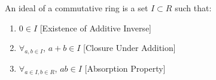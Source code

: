                 \begin{definition}
                    An ideal of a commutative ring is
                    a set $I\subset R$ such that:
                    \begin{enumerate}
                        \item $0\in I$
                              \hfill[Existence of Additive Inverse]
                        \item $\forall_{a,b\in I}$,
                              $a+b\in I$
                              \hfill[Closure Under Addition]
                        \item $\forall_{a\in I,b\in R}$,
                              $a b \in I$
                              \hfill[Absorption Property]
                    \end{enumerate}
                \end{definition}
